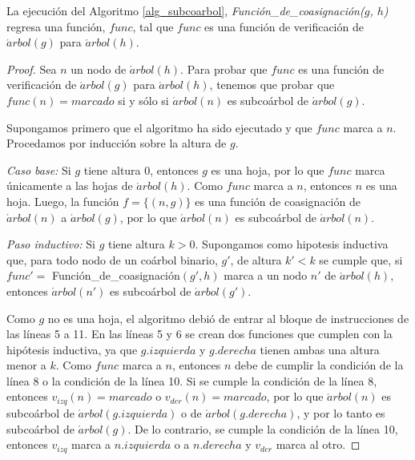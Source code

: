 \begin{theorem}
    La ejecución del Algoritmo \ref{alg_subcoarbol},
    \emph{Función\_de\_coasignación($g$, $h$)} regresa una función, $func$,
    tal que $func$ es una función de verificación de $\acute{a}rbol(g)$ para
    $\acute{a}rbol(h)$.
\end{theorem}

\begin{proof}

    Sea $n$ un nodo de $\acute{a}rbol(h)$. Para probar que $func$ es una
    función de verificación de $\acute{a}rbol(g)$ para $\acute{a}rbol(h)$,
    tenemos que probar que $func(n) = marcado$ si y sólo si
    $\acute{a}rbol(n)$ es subcoárbol de $\acute{a}rbol(g)$.

    Supongamos primero que el algoritmo ha sido ejecutado y que $func$ marca
    a $n$. Procedamos por inducción sobre la altura de $g$.

    \emph{Caso base:} Si $g$ tiene altura 0, entonces $g$ es una hoja, por lo
    que $func$ marca únicamente a las hojas de $\acute{a}rbol(h)$. Como $func$
    marca a $n$, entonces $n$ es una hoja. Luego, la función $f=\{(n,g)\}$ es
    una función de coasignación de $\acute{a}rbol(n)$ a $\acute{a}rbol(g)$,
    por lo que $\acute{a}rbol(n)$ es subcoárbol de $\acute{a}rbol(n)$.

    \emph{Paso inductivo:} Si $g$ tiene altura $k > 0$. Supongamos como
    hipotesis inductiva que, para todo nodo de un coárbol binario, $g'$,
    de altura $k' < k$ se cumple que, si $func' = $
    Función\_de\_coasignación$(g',h)$ marca a un nodo $n'$ de
    $\acute{a}rbol(h)$, entonces $\acute{a}rbol(n')$ es subcoárbol de
    $\acute{a}rbol(g')$.

    Como $g$ no es una hoja, el algoritmo debió de entrar al bloque de
    instrucciones de las líneas 5 a 11. En las líneas 5 y 6 se crean dos
    funciones que cumplen con la hip\'otesis inductiva, ya que $g.izquierda$
    y $g.derecha$ tienen ambas una altura menor a $k$. Como $func$ marca a
    $n$, entonces $n$ debe de cumplir la condición de la línea 8 o la
    condición de la línea 10. Si se cumple la condición de la línea 8,
    entonces $v_{izq}(n) = marcado$ o $v_{der}(n) = marcado$, por lo que
    $\acute{a}rbol(n)$ es subcoárbol de $\acute{a}rbol(g.izquierda)$ o de
    $\acute{a}rbol(g.derecha)$, y por lo tanto es subcoárbol de
    $\acute{a}rbol(g)$. De lo contrario, se cumple la condición de la línea
    10, entonces $v_{izq}$ marca a $n.izquierda$ o a $n.derecha$ y $v_{der}$
    marca al otro.


\end{proof}
